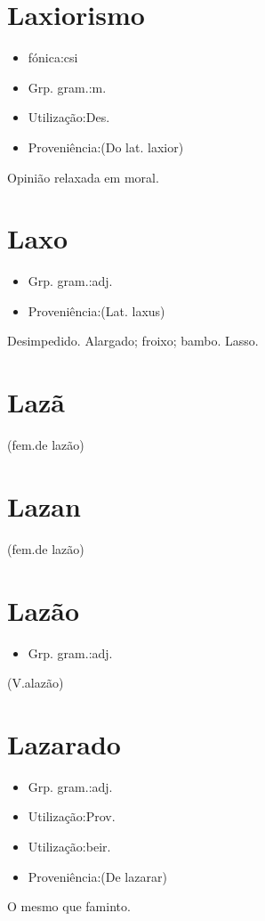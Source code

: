 \section{Laxiorismo}
\begin{itemize}
\item {fónica:csi}
\end{itemize}
\begin{itemize}
\item {Grp. gram.:m.}
\end{itemize}
\begin{itemize}
\item {Utilização:Des.}
\end{itemize}
\begin{itemize}
\item {Proveniência:(Do lat. \textunderscore laxior\textunderscore )}
\end{itemize}
Opinião relaxada em moral.
\section{Laxo}
\begin{itemize}
\item {Grp. gram.:adj.}
\end{itemize}
\begin{itemize}
\item {Proveniência:(Lat. \textunderscore laxus\textunderscore )}
\end{itemize}
Desimpedido.
Alargado; froixo; bambo.
Lasso.
\section{Lazã}
(\textunderscore fem.\textunderscore  de \textunderscore lazão\textunderscore )
\section{Lazan}
(\textunderscore fem.\textunderscore  de \textunderscore lazão\textunderscore )
\section{Lazão}
\begin{itemize}
\item {Grp. gram.:adj.}
\end{itemize}
(V.alazão)
\section{Lazarado}
\begin{itemize}
\item {Grp. gram.:adj.}
\end{itemize}
\begin{itemize}
\item {Utilização:Prov.}
\end{itemize}
\begin{itemize}
\item {Utilização:beir.}
\end{itemize}
\begin{itemize}
\item {Proveniência:(De \textunderscore lazarar\textunderscore )}
\end{itemize}
O mesmo que \textunderscore faminto\textunderscore .
